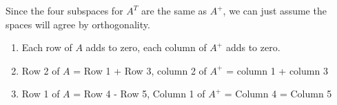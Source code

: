 Since the four subspaces for \(A^T\) are the same as \(A^+\), we can just assume the spaces will agree by orthogonality. 
\begin{enumerate}
    \item Each row of \(A\) adds to zero, each column of \(A^+\) adds to zero. 
    \item Row 2 of \(A\) = Row 1 + Row 3, column 2 of \(A^+\) = column 1 + column 3
    \item Row 1 of \(A\) = Row 4 - Row 5, Column 1 of \(A^+\) = Column 4 = Column 5      
\end{enumerate}  